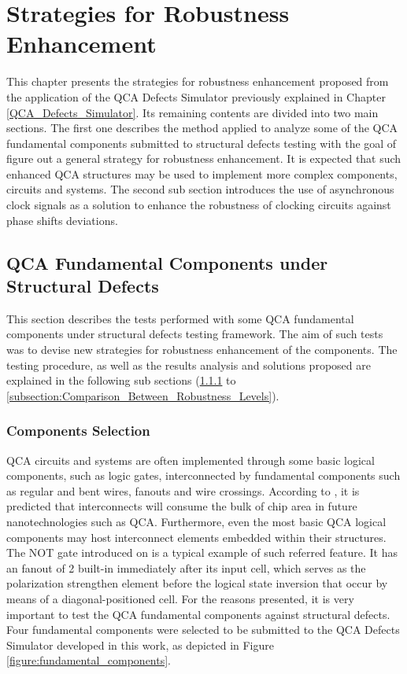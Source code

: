 \chapter{Strategies for Robustness Enhancement}
\label{section:Strategies_for_Robustness_Enhancement}

This chapter presents the strategies for robustness enhancement proposed from the application of the QCA Defects Simulator previously explained in Chapter \ref{QCA_Defects_Simulator}. Its remaining contents are divided into two main sections. The first one describes the method applied to analyze some of the QCA fundamental components submitted to structural defects testing with the goal of figure out a general strategy for robustness enhancement. It is expected that such enhanced QCA structures may be used to implement more complex components, circuits and systems. The second sub section introduces the use of asynchronous clock signals as a solution to enhance the robustness of clocking circuits against phase shifts deviations.

\section{QCA Fundamental Components under Structural Defects}

This section describes the tests performed with some QCA fundamental components under structural defects testing framework. The aim of such tests was to devise new strategies for robustness enhancement of the components. The testing procedure, as well as the results analysis and solutions proposed are explained in the following sub sections (\ref{subsection:Components_Selection} to \ref{subsection:Comparison_Between_Robustness_Levels}).

\subsection{Components Selection}
\label{subsection:Components_Selection}

QCA circuits and systems are often implemented through some basic logical components, such as logic gates, interconnected by fundamental components such as regular and bent wires, fanouts and wire crossings. According to , it is predicted that interconnects will consume the bulk of chip area in future nanotechnologies such as QCA. Furthermore, even the most basic QCA logical components may host interconnect elements embedded within their structures. The NOT gate introduced on \cite{lent93} is a typical example of such referred feature. It has an fanout of 2 built-in immediately after its input cell, which serves as the polarization strengthen element before the logical state inversion that occur by means of a diagonal-positioned cell. For the reasons presented, it is very important to test the QCA fundamental components against structural defects. Four fundamental components were selected to be submitted to the QCA Defects Simulator developed in this work, as depicted in Figure \ref{figure:fundamental_components}.


